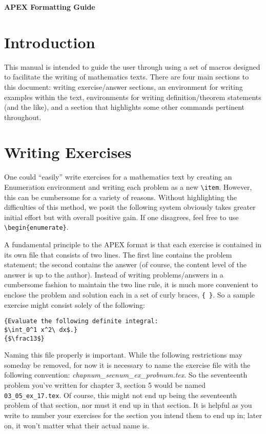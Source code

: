 \documentclass[10pt]{article}
\begin{document}
\begin{center} \Large {\bf APEX Formatting Guide}

\small
\tableofcontents
 \normalsize \end{center}
 
\section{Introduction} 

This manual is intended to guide the user through using a set of macros designed to facilitate the writing of mathematics texts. There are four main sections to this document: writing exercise/answer sections, an environment for writing examples within the text, environments for writing definition/theorem statements (and the like), and a section that highlights some other commands pertinent throughout.

\section{Writing Exercises}

One could ``easily'' write exercises for a mathematics text by creating an Enumeration environment and writing each problem as a new \verb|\item|. However, this can be cumbersome for a variety of reasons. Without highlighting the difficulties of this method, we posit the following system obviously takes greater initial effort but with overall positive gain. If one disagrees, feel free to use \verb|\begin{enumerate}|. 

A fundamental principle to the APEX format is that each exercise is contained in its own file that consists of two lines. The first line contains the problem statement; the second contains the answer (of course, the content level of the answer is up to the author). Instead of writing problems/answers in a cumbersome fashion to maintain the two line rule, it is much more convenient to enclose the problem and solution each in a set of curly braces, \verb|{ }|. So a sample exercise might consist solely of the following:
\begin{verbatim}
{Evaluate the following definite integral: 
$\int_0^1 x^2\ dx$.}
{$\frac13$}
\end{verbatim}

Naming this file properly is important. While the following restrictions may someday be removed, for now it is necessary to name the exercise file with the following convention: {\it chapnum\_secnum\_{\rm ex}\_probnum.{\rm tex}}. So the seventeenth problem you've written for chapter 3, section 5 would be named \verb|03_05_ex_17.tex|. Of course, this might not end up being the seventeenth problem of that section, nor must it end up in that section. It is helpful as you write to number your exercises for the section you intend them to end up in; later on, it won't matter what their actual name is.
\end{document}
